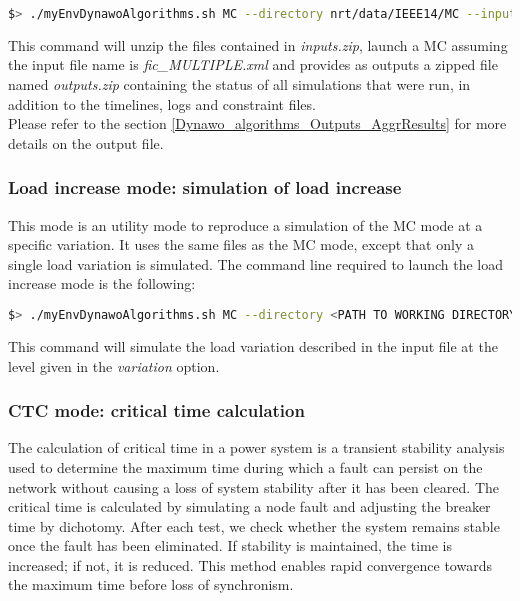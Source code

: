 \documentclass[a4paper, 12pt]{report}
\begin{document}
\begin{lstlisting}[language=bash, breaklines=true, breakatwhitespace=false]
$> ./myEnvDynawoAlgorithms.sh MC --directory nrt/data/IEEE14/MC --input inputs.zip --output outputs.zip
\end{lstlisting}

This command will unzip the files contained in \textit{inputs.zip}, launch a MC assuming the input file name is \textit{fic\_MULTIPLE.xml}
and provides as outputs a zipped file named \textit{outputs.zip} containing the status of all simulations that were run, 
in addition to the timelines, logs and constraint files.\\

Please refer to the section \ref{Dynawo_algorithms_Outputs_AggrResults} for more details on the output file.

\subsubsection{Load increase mode: simulation of load increase}

This mode is an utility mode to reproduce a simulation of the MC mode at a specific variation.
It uses the same files as the MC mode, except that only a single load variation is simulated.
The command line required to launch the load increase mode is the following:

\begin{lstlisting}[language=bash, breaklines=true, breakatwhitespace=false]
$> ./myEnvDynawoAlgorithms.sh MC --directory <PATH TO WORKING DIRECTORY> --input <NAME OF INPUT FILE> --output <NAME OF OUTPUT FILE> --variation <VALUE BETWEEN 0 AND 100>
\end{lstlisting}

This command will simulate the load variation described in the input file at the level given in the \textit{variation} option.

\subsubsection{CTC mode: critical time calculation}

The calculation of critical time in a power system is a transient stability analysis used to determine the maximum time during which a fault can persist on the network without causing a loss of system stability after it has been cleared. The critical time is calculated by simulating a node fault and adjusting the breaker time by dichotomy. After each test, we check whether the system remains stable once the fault has been eliminated. If stability is maintained, the time is increased; if not, it is reduced. This method enables rapid convergence towards the maximum time before loss of synchronism.
\end{document}
